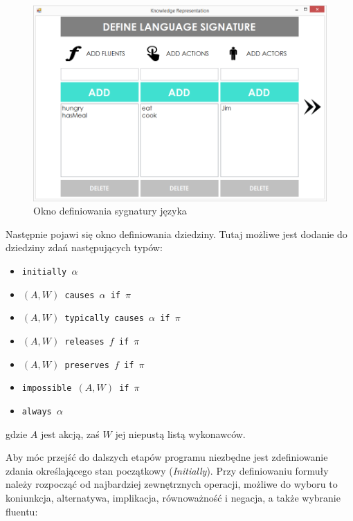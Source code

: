 \documentclass{article}
\begin{document}
\begin{figure}[H]
\centering
\includegraphics[scale=0.4]{05}
\caption{Okno definiowania sygnatury języka}
\end{figure}

Następnie pojawi się okno definiowania dziedziny. Tutaj możliwe jest dodanie do dziedziny zdań następujących typów: 
\begin{itemize}
\item {\large\texttt{initially $\alpha$}}\\
\item {\large\texttt{$(A,W)$ causes $\alpha$ if $\pi$}}\\
\item {\large\texttt{$(A,W)$ typically causes $\alpha$ if $\pi$}}\\
\item {\large\texttt{$(A,W)$ releases $f$ if $\pi$}}\\
\item {\large\texttt{$(A,W)$ preserves $f$ if $\pi$}}\\
\item {\large\texttt{impossible $(A,W)$ if $\pi$}}\\
\item {\large\texttt{always $\alpha$}}\\
\end{itemize}
gdzie $A$ jest akcją, zaś $W$ jej niepustą listą wykonawców.
\newpage

Aby móc przejść do dalszych etapów programu niezbędne jest zdefiniowanie zdania określającego stan początkowy (\textit{Initially}). 
Przy definiowaniu formuły należy rozpocząć od najbardziej zewnętrznych operacji, możliwe do wyboru to koniunkcja, alternatywa, implikacja, równoważność i negacja, a także wybranie fluentu: 
\end{document}
